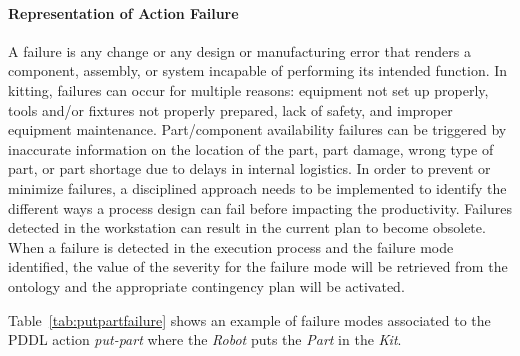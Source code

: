 \paragraph{Representation of Action Failure}\label{sss:failure}
 A failure is any change or any design or manufacturing error that renders a 
component, assembly, or system incapable of performing its intended function. 
In kitting, failures can occur for multiple reasons: equipment not set up properly, 
tools and/or fixtures not properly prepared, lack of safety, and improper equipment 
maintenance. Part/component availability failures can be triggered by inaccurate information 
on the location of the part, part damage, wrong type of part, or part shortage due to delays 
in internal logistics. In order to prevent or minimize failures, a disciplined approach 
needs to be implemented to identify the different ways a process design can fail before 
impacting the productivity. Failures detected in the workstation can result in the current 
plan to become obsolete. When a failure is detected in the execution process and the failure 
mode identified, the value of the severity for the failure mode will be retrieved from the 
ontology and the appropriate contingency plan will be activated.

 Table~\ref{tab:putpartfailure} shows an example of failure modes associated to the PDDL 
action \textsl{put-part} where the \textit{Robot} puts the \textit{Part} in the \textit{Kit}.

